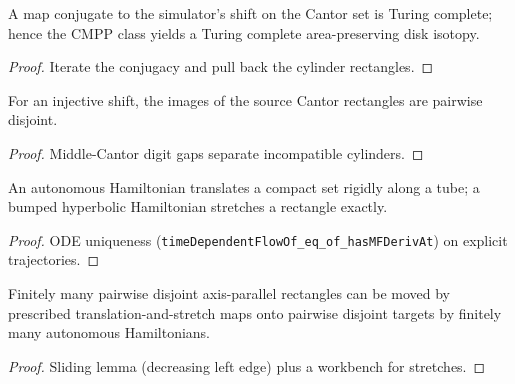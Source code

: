 \begin{lemma}
\label{lem_sim_witness}
\leanok
{}
A map conjugate to the simulator's shift on the Cantor set is Turing complete; hence the CMPP
class yields a Turing complete area-preserving disk isotopy.
\end{lemma}
\begin{proof}\leanok
Iterate the conjugacy and pull back the cylinder rectangles.
\end{proof}

\begin{lemma}
\label{lem_g0}
\leanok
{}
For an injective shift, the images of the source Cantor rectangles are pairwise disjoint.
\end{lemma}
\begin{proof}\leanok
Middle-Cantor digit gaps separate incompatible cylinders.
\end{proof}

\begin{lemma}
\label{lem_primitives}
\leanok
{}
An autonomous Hamiltonian translates a compact set rigidly along a tube; a bumped hyperbolic
Hamiltonian stretches a rectangle exactly.
\end{lemma}
\begin{proof}\leanok
ODE uniqueness (\texttt{timeDependentFlowOf\_eq\_of\_hasMFDerivAt}) on explicit trajectories.
\end{proof}

\begin{theorem}
\label{thm_relocation}
\leanok
{}
Finitely many pairwise disjoint axis-parallel rectangles can be moved by prescribed
translation-and-stretch maps onto pairwise disjoint targets by finitely many autonomous
Hamiltonians.
\end{theorem}
\begin{proof}\leanok
Sliding lemma (decreasing left edge) plus a workbench for stretches.
\end{proof}

